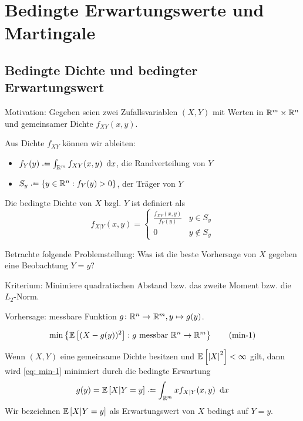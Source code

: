 \section{Bedingte Erwartungswerte und Martingale}

\subsection{Bedingte Dichte und bedingter Erwartungswert}

Motivation: Gegeben seien zwei Zufallsvariablen $(X,Y)$ mit Werten in $\mathbb{R}^m \times \mathbb{R}^n$ und gemeinsamer Dichte $f_{XY}(x,y)$.

Aus Dichte $f_{XY}$ können wir ableiten:
\begin{itemize}
	\item $f_Y(y) \defeq \int_{\R^m} f_{XY}(x,y) \dx$, die Randverteilung von $Y$
	\item $S_y \defeq \menge{y \in \Rn : f_Y(y) > 0}$, der Träger von $Y$
\end{itemize}

\begin{definition}
	Die bedingte Dichte von $X$ bzgl. $Y$ ist definiert als
	\begin{equation*}
	f_{X|Y}(x,y) = \begin{cases}
	\frac{f_{XY}(x,y)}{f_Y(y)} & y \in S_y \\ 0 & y \notin S_y
	\end{cases}
	\end{equation*}
\end{definition}

Betrachte folgende Problemstellung: Was ist die beste Vorhersage von $X$ gegeben eine Beobachtung $Y = y$?

Kriterium: Minimiere quadratischen Abstand bzw. das zweite Moment bzw. die $L_2$-Norm.

Vorhersage: messbare Funktion $\abb{g}{\Rn}{\R^m}, y \mapsto g(y)$.

\begin{equation}
\min\left\{ \mathbb{E} \left[ (X-g(y))^2 \right] : g \text{ messbar } \mathbb{R}^n \to \mathbb{R}^m \right\} \tag{min-1} \label{eq: min-1}
\end{equation}

\begin{proposition} %
	Wenn $(X,Y)$ eine gemeinsame Dichte besitzen und $\mathbb{E} \left[ \left| X \right|^2 \right] < \infty$ gilt, dann wird \eqref{eq: min-1} minimiert durch die bedingte Erwartung
	\begin{equation*}
	g(y) = \EW[X | Y=y] \defeq \int_{\R^m} x f_{X | Y}(x,y) \dx
	\end{equation*}
	Wir bezeichnen $ \mathbb{E} \left[ X | Y=y \right]$ als Erwartungswert von $X$ bedingt auf $Y=y$.
\end{proposition}

